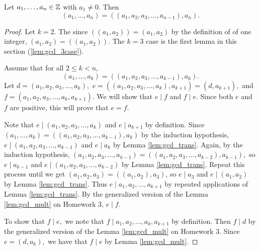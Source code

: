 \documentclass{../ximera}
\begin{document}
\begin{proposition}
 	Let $a_1,\dots,a_n\in\mathbb Z$ with $a_1\neq 0$.  Then 
		\[
			(a_1,\dots,a_n)
			=((a_1,a_2,a_3,\dots,a_{n-1}),a_n).
		\]
	\begin{proof}
 		Let $k=2$. The since $((a_1,a_2))=(a_1,a_2)$ by the definition of  of one integer,  $(a_1,a_2)=((a_1,a_2))$. The $k=3$ case is the first lemma in this section (\ref{lem:gcd_3case}).
 
 		Assume that for all $2\leq k< n$, 
 			\[
				(a_1,\dots,a_k)
				=((a_1,a_2,a_3,\dots,a_{k-1}),a_k).
			\]
		Let $d=(a_1,a_2,a_3,\dots,a_{k}),$
		$e=((a_1,a_2,a_3,\dots,a_{k}),a_{k+1})=(d,a_{k+1}),$ and $f= (a_1,a_2,a_3,\dots,a_{k},a_{k+1}).$ We will show that $e\mid f$ and $f\mid e$. Since both $e$ and $f$ are positive, this will prove that $e=f$.

		Note that $e\mid (a_1,a_2,a_3,\dots,a_{k})$ and $e\mid a_{k+1}$ by definition. 
		Since $(a_1,\dots,a_k)=((a_1,a_2,a_3,\dots,a_{k-1}),a_k)$ by the induction hypothesis, $e\mid(a_1,a_2,a_3,\dots,a_{k-1})$ and $e\mid a_k$ by Lemma \ref{lem:gcd_trans}. Again, by the induction hypothesis, $(a_1,a_2,a_3,\dots,a_{k-1})=((a_1,a_2,a_3,\dots,a_{k-2}),a_{k-1}),$ so $e\mid a_{k-1}$ and $e\mid (a_1,a_2,a_3,\dots,a_{k-2})$ by Lemma \ref{lem:gcd_trans}. Repeat this process until we get $(a_1,a_2,a_3)=((a_1,a_2),a_3)$, so $e\mid a_3$ and $e\mid (a_1,a_2)$ by Lemma \ref{lem:gcd_trans}. Thus $e\mid a_1,a_2,\dots,a_{k+1}$ by repeated applications of Lemma \ref{lem:gcd_trans}. By the generalized version of the Lemma \ref{lem:gcd_mult} on Homework 3, $e\mid f.$

		To show that $f\mid e,$ we note that $f\mid a_1,a_2,\dots, a_k,a_{k+1}$ by definition. Then $f\mid d$ by the generalized version of the Lemma \ref{lem:gcd_mult} on Homework 3. Since $e=(d,a_k),$ we have that $f\mid e$ by Lemma \ref{lem:gcd_mult}.
	\end{proof}
\end{proposition}
\end{document}
